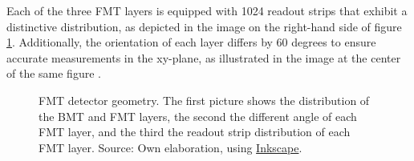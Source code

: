     Each of the three FMT layers is equipped with 1024 readout strips that exhibit a distinctive distribution, as depicted in the image on the right-hand side of figure \ref{fig::fmt_geometry}.
    Additionally, the orientation of each layer differs by 60 degrees to ensure accurate measurements in the xy-plane, as illustrated in the image at the center of the same figure \cite{acker2020mvt}.

    \begin{figure}[t]
        \centering{}
        \caption[FMT detector geometry.]{FMT detector geometry. The first picture shows the distribution of the BMT and FMT layers, the second the different angle of each FMT layer, and the third the readout strip distribution of each FMT layer.
        Source: Own elaboration, using \hyperlink{https://inkscape.org/}{Inkscape}.}
        \label{fig::fmt_geometry}
    \end{figure}

    
